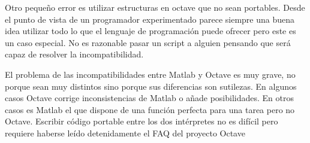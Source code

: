 Otro pequeño error es utilizar estructuras en octave que no sean portables.
Desde el punto de vista de un programador experimentado parece siempre
una buena idea utilizar todo lo que el lenguaje de programación puede
ofrecer pero este es un caso especial. No es razonable pasar un script
a alguien pensando que será capaz de resolver la incompatibilidad.

El problema de las incompatibilidades entre Matlab y Octave es muy
grave, no porque sean muy distintos sino porque sus diferencias son
sutilezas. En algunos casos Octave corrige inconsistencias de Matlab
o añade posibilidades. En otros casos es Matlab el que dispone de
una función perfecta para una tarea pero no Octave. Escribir código
portable entre los dos intérpretes no es difícil pero requiere haberse
leído detenidamente el FAQ del proyecto Octave

